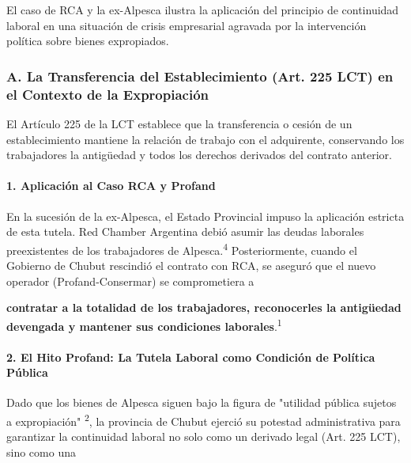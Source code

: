 \documentclass[]{article}
\begin{document}
El caso de RCA y la ex-Alpesca ilustra la aplicación del principio de
continuidad laboral en una situación de crisis empresarial agravada por
la intervención política sobre bienes expropiados.

\hypertarget{a.-la-transferencia-del-establecimiento-art.-225-lct-en-el-contexto-de-la-expropiaciuxf3n}{%
\subsubsection{A. La Transferencia del Establecimiento (Art. 225 LCT) en
el Contexto de la
Expropiación}\label{a.-la-transferencia-del-establecimiento-art.-225-lct-en-el-contexto-de-la-expropiaciuxf3n}}

El Artículo 225 de la LCT establece que la transferencia o cesión de un
establecimiento mantiene la relación de trabajo con el adquirente,
conservando los trabajadores la antigüedad y todos los derechos
derivados del contrato anterior.

\hypertarget{aplicaciuxf3n-al-caso-rca-y-profand}{%
\paragraph{1. Aplicación al Caso RCA y
Profand}\label{aplicaciuxf3n-al-caso-rca-y-profand}}

En la sucesión de la ex-Alpesca, el Estado Provincial impuso la
aplicación estricta de esta tutela. Red Chamber Argentina debió asumir
las deudas laborales preexistentes de los trabajadores de
Alpesca.\textsuperscript{4} Posteriormente, cuando el Gobierno de Chubut
rescindió el contrato con RCA, se aseguró que el nuevo operador
(Profand-Consermar) se comprometiera a

\textbf{contratar a la totalidad de los trabajadores, reconocerles la
antigüedad devengada y mantener sus condiciones
laborales}.\textsuperscript{1}

\hypertarget{el-hito-profand-la-tutela-laboral-como-condiciuxf3n-de-poluxedtica-puxfablica}{%
\paragraph{2. El Hito Profand: La Tutela Laboral como Condición de
Política
Pública}\label{el-hito-profand-la-tutela-laboral-como-condiciuxf3n-de-poluxedtica-puxfablica}}

Dado que los bienes de Alpesca siguen bajo la figura de "utilidad
pública sujetos a expropiación" \textsuperscript{2}, la provincia de
Chubut ejerció su potestad administrativa para garantizar la continuidad
laboral no solo como un derivado legal (Art. 225 LCT), sino como una
\end{document}

